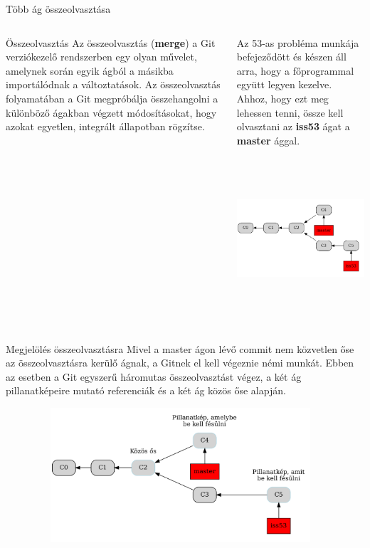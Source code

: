 \documentclass[english, aspectratio=169]{beamer}
\begin{document}
\begin{frame}{Több ág összeolvasztása}
\begin{columns}
\begin{column}{0.4\textwidth}
\begin{center}
\begin{block}{Összeolvasztás}
Az összeolvasztás (\textbf{merge}) a Git verziókezelő rendszerben egy olyan művelet, amelynek során egyik ágból a másikba importálódnak a változtatások. Az összeolvasztás folyamatában a Git megpróbálja összehangolni a különböző ágakban végzett módosításokat, hogy azokat egyetlen, integrált állapotban rögzítse.
\end{block}
\end{center}
\end{column}
\begin{column}{0.6\textwidth}
Az 53-as probléma munkája befejeződött és készen áll arra, hogy a főprogrammal együtt legyen kezelve. Ahhoz, hogy ezt meg lehessen tenni, össze kell olvasztani az \textbf{iss53} ágat a \textbf{master} ággal.
\begin{center}
\includegraphics[height=6cm, width=8cm, keepaspectratio]{graphs/git_15.png}
\end{center}
\end{column}
\end{columns}
\end{frame}

\begin{frame}{Megjelölés összeolvasztásra}
Mivel a master ágon lévő commit nem közvetlen őse az összeolvasztásra kerülő ágnak, a Gitnek el kell végeznie némi munkát. Ebben az esetben a Git egyszerű háromutas összeolvasztást végez, a két ág pillanatképeire mutató referenciák és a két ág közös őse alapján.
\begin{center}
\includegraphics[height=5cm, width=13cm, keepaspectratio]{graphs/git_16.png}
\end{center}
\end{frame}
\end{document}
